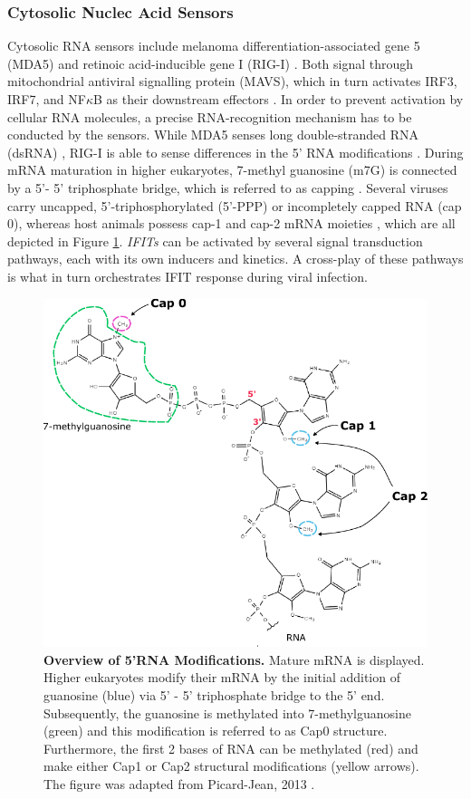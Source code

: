 \subsubsection{Cytosolic Nuclec Acid Sensors} \label{Cytosolic Nuclec Acid Sensors}
Cytosolic RNA sensors include melanoma differentiation-associated gene 5 (MDA5) and retinoic acid-inducible gene I (RIG-I) \cite{Vladimer2014IFITs:Proteins}. Both signal through mitochondrial antiviral signalling protein (MAVS), which in turn activates IRF3, IRF7, and NF\(\kappa\)B as their downstream effectors \cite{Ashley2019Interferon-IndependentCytomegalovirus}. In order to prevent activation by cellular RNA molecules, a precise RNA-recognition mechanism has to be conducted by the sensors. While MDA5 senses long double-stranded RNA (dsRNA) \cite{Brisse2019ComparativeMDA5}, RIG-I is able to sense differences in the 5' RNA modifications \cite{Schlee2016DiscriminatingSensing}. During mRNA maturation in higher eukaryotes, 7-methyl guanosine (m7G) is connected by a 5'- 5' triphosphate bridge, which is referred to as capping \cite{Devarkar2016StructuralRIG-I, Ramanathan2016MRNAApplications}. Several viruses carry uncapped, 5'-triphosphorylated (5'-PPP) or incompletely capped RNA (cap 0), whereas host animals possess cap-1 and cap-2 mRNA moieties \cite{Choi2018ACaps}, which are all depicted in Figure \ref{fig:Overview of 5'RNA Modifications.}. \textit{IFITs} can be activated by several signal transduction pathways, each with its own inducers and kinetics. A cross-play of these pathways is what in turn orchestrates IFIT response during viral infection.

\begin{figure}
    \centering
    \includegraphics[width=0.75\linewidth]{04. Introduction//Figs/02. 5-RNA Modifications.pdf}
    \caption[Overview of 5'RNA Modifications.]{\textbf{Overview of 5'RNA Modifications.} Mature mRNA is displayed. Higher eukaryotes modify their mRNA by the initial addition of guanosine (blue) via 5' - 5' triphosphate bridge to the 5' end. Subsequently, the guanosine is methylated into 7-methylguanosine (green) and this modification is referred to as Cap0 structure. Furthermore, the first 2 bases of RNA can be methylated (red) and make either Cap1 or Cap2 structural modifications (yellow arrows). The figure was adapted from Picard-Jean, 2013 \cite{Picard-Jean2013RNAGenomes}.}
    \label{fig:Overview of 5'RNA Modifications.}
\end{figure}

